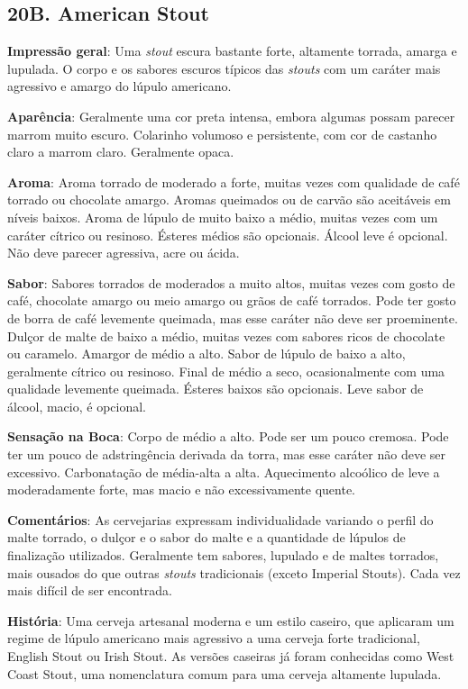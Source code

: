\subsection*{20B. American Stout}
\textbf{Impressão geral}: Uma \textit{stout} escura bastante forte, altamente torrada, amarga e lupulada. O corpo e os sabores escuros típicos das \textit{stouts} com um caráter mais agressivo e amargo do lúpulo americano.

\textbf{Aparência}: Geralmente uma cor preta intensa, embora algumas possam parecer marrom muito escuro. Colarinho volumoso e persistente, com cor de castanho claro a marrom claro. Geralmente opaca.

\textbf{Aroma}: Aroma torrado de moderado a forte, muitas vezes com qualidade de café torrado ou chocolate amargo. Aromas queimados ou de carvão são aceitáveis em níveis baixos. Aroma de lúpulo de muito baixo a médio, muitas vezes com um caráter cítrico ou resinoso. Ésteres médios são opcionais. Álcool leve é opcional. Não deve parecer agressiva, acre ou ácida.

\textbf{Sabor}: Sabores torrados de moderados a muito altos, muitas vezes com gosto de café, chocolate amargo ou meio amargo ou grãos de café torrados. Pode ter gosto de borra de café levemente queimada, mas esse caráter não deve ser proeminente. Dulçor de malte de baixo a médio, muitas vezes com sabores ricos de chocolate ou caramelo. Amargor de médio a alto. Sabor de lúpulo de baixo a alto, geralmente cítrico ou resinoso. Final de médio a seco, ocasionalmente com uma qualidade levemente queimada. Ésteres baixos são opcionais. Leve sabor de álcool, macio, é opcional.

\textbf{Sensação na Boca}: Corpo de médio a alto. Pode ser um pouco cremosa. Pode ter um pouco de adstringência derivada da torra, mas esse caráter não deve ser excessivo. Carbonatação de média-alta a alta. Aquecimento alcoólico de leve a moderadamente forte, mas macio e não excessivamente quente.

\textbf{Comentários}: As cervejarias expressam individualidade variando o perfil do malte torrado, o dulçor e o sabor do malte e a quantidade de lúpulos de finalização utilizados. Geralmente tem sabores, lupulado e de maltes torrados, mais ousados do que outras \textit{stouts} tradicionais (exceto Imperial Stouts). Cada vez mais difícil de ser encontrada.

\textbf{História}: Uma cerveja artesanal moderna e um estilo caseiro, que aplicaram um regime de lúpulo americano mais agressivo a uma cerveja forte tradicional, English Stout ou Irish Stout. As versões caseiras já foram conhecidas como West Coast Stout, uma nomenclatura comum para uma cerveja altamente lupulada.

